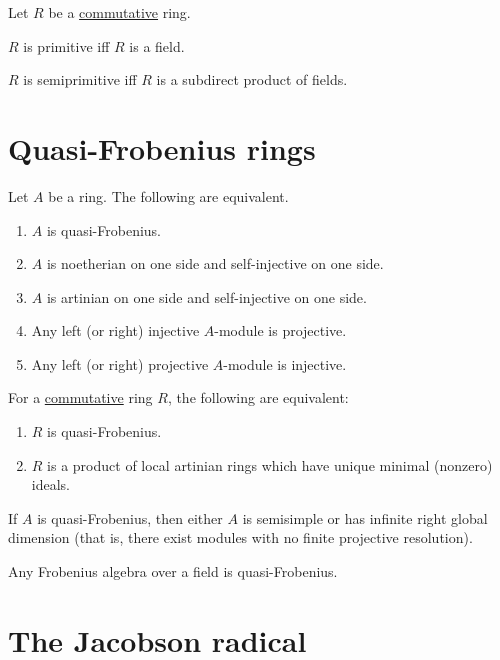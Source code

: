 \documentclass[12pt]{article}
\begin{document}
\begin{cor}
	Let $R$ be a \underline{commutative} ring.

	$R$ is primitive iff $R$ is a field. 

	$R$ is semiprimitive iff $R$ is a subdirect product of fields. 
\end{cor}

\section{Quasi-Frobenius rings}

\begin{thm} \label{thm:quasi-frobenius-equivalences}
	Let $A$ be a ring. The following are equivalent.
	\begin{enumerate}[label=(\alph*)]
		\item $A$ is quasi-Frobenius.
		\item $A$ is noetherian on one side and self-injective on one side.
		\item $A$ is artinian on one side and self-injective on one side.
		\item Any left (or right) injective $A$-module is projective.
		\item Any left (or right) projective $A$-module is injective.
	\end{enumerate}
\end{thm}

\begin{thm}
	For a \underline{commutative} ring $R$, the following are equivalent:
	\begin{enumerate}[label=(\alph*)]
		\item $R$ is quasi-Frobenius.
		\item $R$ is a product of local artinian rings which have unique minimal (nonzero) ideals.
	\end{enumerate}
\end{thm}

\begin{thm} \label{thm:quasi-frobenius-either-semisimple-or-infinite}
	If $A$ is quasi-Frobenius, then either $A$ is semisimple or has infinite right global dimension (that is, there exist modules with no finite projective resolution).
\end{thm}

\begin{thm}
	Any Frobenius algebra over a field is quasi-Frobenius.
\end{thm}

\section{The Jacobson radical}
\end{document}
